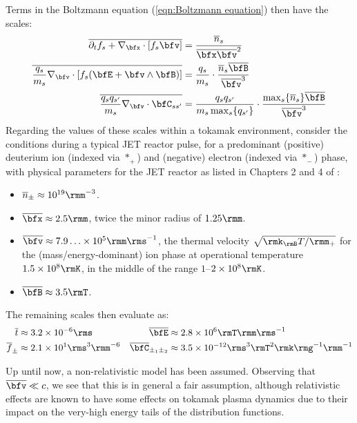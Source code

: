     Terms in the Boltzmann equation (\ref{eqn:Boltzmann equation}) then have the scales:
    \begin{align}
        \overline{\partial_{t}f_{s} + \nabla_{\bfx}\cdot[f_{s}\bfv]}  &=  \frac{\overline{n}_{s}}{\overline{\bfx}\overline{\bfv}^{2}}  \label{eqn:convective scale}  \\
        \overline{\frac{q_{s}}{m_{s}}\nabla_{\bfv}\cdot[f_{s}(\bfE + \bfv\wedge\bfB)]}  &=  \frac{q_{s}}{m_{s}}\cdot\frac{\overline{n}_{s}\overline{\bfB}}{\overline{\bfv}^{3}}  \\
        \overline{\frac{q_{s}q_{s'}}{m_{s}}\nabla_{\bfv}\cdot\bfC_{ss'}}  &=  \frac{q_{s}q_{s'}}{m_{s}\max_{s}\{q_{s'}\}}\cdot\frac{\max_{s}\{\overline{n}_{s}\}\overline{\bfB}}{\overline{\bfv}^{3}}  \label{eqn:collisional scale}
    \end{align}
    Regarding the values of these scales within a tokamak environment, consider the conditions during a typical JET reactor pulse, for a predominant (positive) deuterium ion (indexed via $*_{+}$) and (negative) electron (indexed via $*_{-}$) phase, with physical parameters for the JET reactor as listed in Chapters 2 and 4 of \cite{Wes00}:
    \begin{itemize}
        \item  $\overline{n}_{\pm}  \approx  10^{19}\rmm^{- 3}$.
        \item  $\overline{\bfx}     \approx  2.5\rmm$, twice the minor radius of $1.25\rmm$.
        \item  $\overline{\bfv}     \approx  7.9\ldots\times 10^{5}\rmm\rms^{- 1}$, the thermal velocity $\sqrt{\rmk_{\rmB}T/\rmm_{+}}$ for the (mass/energy-dominant) ion phase at operational temperature $1.5\times 10^{8}\rmK$, in the middle of the range $1$–$2\times 10^{8}\rmK$.
        \item  $\overline{\bfB}     \approx  3.5\rmT$.
    \end{itemize}    
    The remaining scales then evaluate as:
    \begin{align*}
        \overline{t}           &\approx  3.2\times 10^{- 6}\rms              &
        \overline{\bfE}        &\approx  2.8\times 10^{6}\rmT\rmm\rms^{- 1}  \\
        \overline{f}_{\pm}     &\approx  2.1\times 10^{1}\rms^{3}\rmm^{- 6}  &
        \overline{\bfC}_{\pm_{1}\pm_{2}}  &\approx  3.5\times 10^{- 12}\rms^{3}\rmT^{2}\rmk\rmg^{- 1}\rmm^{- 1}
    \end{align*}
    
    \begin{remark}
        Up until now, a non-relativistic model has been assumed. Observing that $\overline{\bfv}  \ll  c$, we see that this is in general a fair assumption, although relativistic effects are known to have some effects on tokamak plasma dynamics due to their impact on the very-high energy tails of the distribution functions.
    \end{remark}
    
